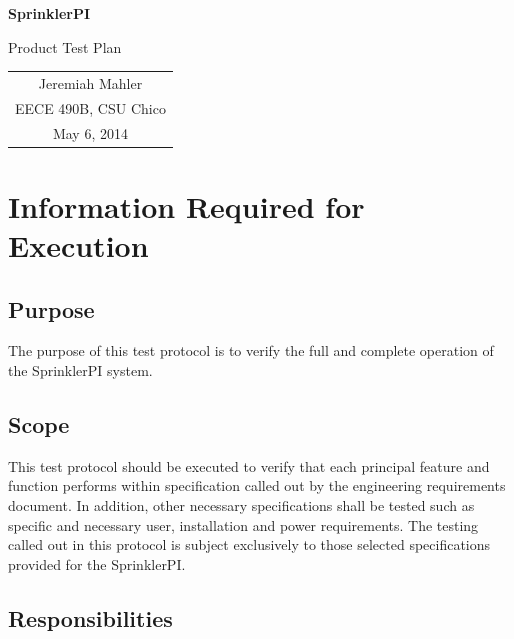 \documentclass{article}
\begin{document}
\vspace*{1.0in}

\centerline{\LARGE \textbf{SprinklerPI}}
\vspace{0.3in}
\centerline{\LARGE Product Test Plan}

\vfill

\begin{center}
\begin{tabular}{c}
Jeremiah Mahler \\
EECE 490B, CSU Chico \\
May 6, 2014
\end{tabular}
\end{center}

\vspace{2in}

\thispagestyle{empty}

\pagebreak

\thispagestyle{empty}
\tableofcontents
\clearpage

\section{Information Required for Execution}

\subsection{Purpose}

The purpose of this test protocol is to verify the full and complete
operation of the SprinklerPI system.

\subsection{Scope}

This test protocol should be executed to verify that each principal feature
and function performs within specification called out by the engineering
requirements document. In addition, other necessary specifications shall
be tested such as specific and necessary user, installation and power
requirements. The testing called out in this protocol is subject exclusively
to those selected specifications provided for the SprinklerPI.

\subsection{Responsibilities}
\end{document}
